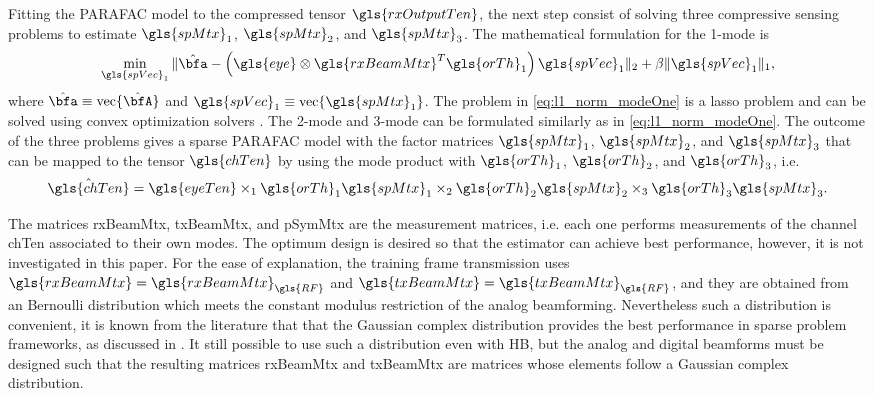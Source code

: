 \documentclass[conference]{IEEEtran}
\begin{document}
Fitting the \gls{PARAFAC} model to the compressed tensor $\gls{rxOutputTen}$,
the next step consist of solving three compressive sensing problems to estimate
$\gls{spMtx}_1$, $\gls{spMtx}_2$, and $\gls{spMtx}_3$. The mathematical
formulation for the 1-mode is
\begin{equation}
  \label{eq:l1_norm_modeOne}
  \min_{\gls{spVec}_1} \|\hat{\bfa} - \left( \gls{eye} \otimes \gls{rxBeamMtx}^T\gls{orTh}_1\right) \gls{spVec}_1\|_2 + \beta \|\gls{spVec}_1\|_1, 
\end{equation}
where $\hat{\bfa} \equiv \textrm{vec}\{\hat{\bfA}\}$ and  $\gls{spVec}_1 \equiv
\textrm{vec}\{\gls{spMtx}_1\}$. The problem in \eqref{eq:l1_norm_modeOne} is a
\gls{lasso} problem and can be solved using convex optimization solvers
\cite{Boyd:2004}. The 2-mode and 3-mode can be formulated similarly as in
\eqref{eq:l1_norm_modeOne}. The outcome of the three problems gives a sparse \gls{PARAFAC} model with
the factor matrices $\gls{spMtx}_1$, $\gls{spMtx}_2$, and $\gls{spMtx}_3$ that
can be mapped to the tensor $\gls{chTen}$ by using the mode product with
$\gls{orTh}_1$,  $\gls{orTh}_2$, and $\gls{orTh}_3$, i.e.
\begin{equation}
  \label{eq:sparse_mapping}
 \hat{\gls{chTen}}  =   \gls{eyeTen} \times_1  \gls{orTh}_1\gls{spMtx}_1 \times_2  \gls{orTh}_2\gls{spMtx}_2 \times_3 \gls{orTh}_3\gls{spMtx}_3.
\end{equation}

The matrices \gls{rxBeamMtx},
\gls{txBeamMtx}, and \gls{pSymMtx} are the measurement matrices, i.e. each one
performs measurements of the channel \gls{chTen} associated to their own modes.
The optimum design is desired so that the estimator can achieve best
performance, however, it is not investigated in this paper. For the ease of
explanation, the training frame transmission uses $\gls{rxBeamMtx} =
\gls{rxBeamMtx}_{\gls{RF}}$ and $\gls{txBeamMtx} = \gls{txBeamMtx}_{\gls{RF}}$,
and they are obtained from an Bernoulli distribution which meets the constant
modulus restriction of the analog beamforming. Nevertheless such a distribution
is convenient, it is known from the
literature that that the Gaussian complex distribution provides the best
performance in sparse problem frameworks, as discussed in  \cite{Donoho:2006}.
It still possible to use such a distribution even with \gls{HB}, but the analog
and digital beamforms must be designed such that the resulting matrices
\gls{rxBeamMtx} and \gls{txBeamMtx} are matrices whose elements follow a
Gaussian complex distribution. 
\end{document}
